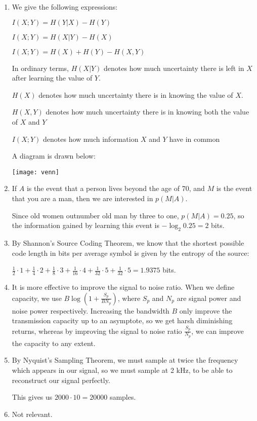 


\begin{enumerate}[label=(\alph*)]

  \item
    We give the following expressions:

    $I(X;Y) = H(Y|X) - H(Y)$

    $I(X;Y) = H(X|Y) - H(X)$

    $I(X;Y) = H(X) + H(Y) - H(X,Y)$

    In ordinary terms, $H(X|Y)$ denotes how much uncertainty there is left in $X$ after learning the value of $Y$.

    $H(X)$ denotes how much uncertainty there is in knowing the value of $X$.

    $H(X,Y)$ denotes how much uncertainty there is in knowing both the value of $X$ and $Y$

    $I(X;Y)$ denotes how much information $X$ and $Y$ have in common

    A diagram is drawn below:

    \texttt{[image: venn]}

  \item
    If $A$ is the event that a person lives beyond the age of 70, and $M$ is the event that you are a man, then we are interested in $p(M|A)$.

    Since old women outnumber old man by three to one, $p(M|A) = 0.25$, so the information gained by learning this event is $-\log_2 0.25 = 2$ bits.

  \item
    By Shannon's Source Coding Theorem, we know that the shortest possible code length in bits per average symbol is given by the entropy of the source:

    $\frac{1}{2} \cdot 1 + \frac{1}{4} \cdot 2 + \frac{1}{8} \cdot 3 + \frac{1}{16} \cdot 4 + \frac{1}{32} \cdot 5 + \frac{1}{32} \cdot 5 = 1.9375$ bits.

  \item
    It is more effective to improve the signal to noise ratio. When we define capacity, we use $B\log(1 + \frac{S_p}{BN_p})$, where $S_p$ and $N_p$ are signal power and noise power respectively. Increasing the bandwidth $B$ only improve the transmission capacity up to an asymptote, so we get harsh diminishing returns, whereas by improving the signal to noise ratio $\frac{S_p}{N_p}$, we can improve the capacity to any extent.

  \item
    By Nyquist's Sampling Theorem, we must sample at twice the frequency which appears in our signal, so we must sample at 2 kHz, to be able to reconstruct our signal perfectly.

    This gives us $2000 \cdot 10 = 20000$ samples.

  \item
    Not relevant.




        
\end{enumerate}

